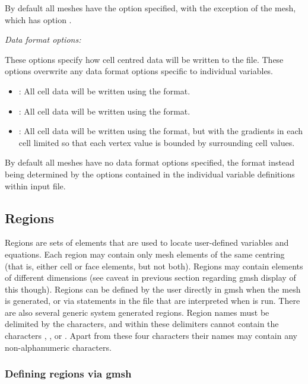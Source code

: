 By default all meshes have the  option specified, with the exception of the  mesh, which has option .

\emph{Data format options:}

These options specify how cell centred data will be written to the  file.  These options overwrite any data format options specific to individual variables.
\begin{itemize}
\item {}:  All cell data will be written using the  format.
\item {}:  All cell data will be written using the  format.
\item {}:  All cell data will be written using the  format, but with the gradients in each cell limited so that each vertex value is bounded by surrounding cell values.
\end{itemize}

By default all meshes have no data format options specified, the format instead being determined by the options contained in the individual variable definitions within input  file.

\subsection{Regions \label{sec:regions}}

Regions are sets of elements that are used to locate user-defined variables and equations.  Each region may contain only mesh elements of the same centring (that is, either cell or face elements, but not both).  Regions may contain elements of different dimensions (see caveat in previous section regarding gmsh display of this though).  Regions can be defined by the user directly in gmsh when the mesh is generated, or via statements in the  file that are interpreted when  is run.  There are also several generic system generated regions.  Region names must be delimited by the \code{<>} characters, and within these delimiters cannot contain the characters \code{<}, \code{>}, \code{\#} or .  Apart from these four characters their names may contain any non-alphanumeric characters.

\subsubsection{Defining regions via gmsh \label{sec:gmsh_regions}}

